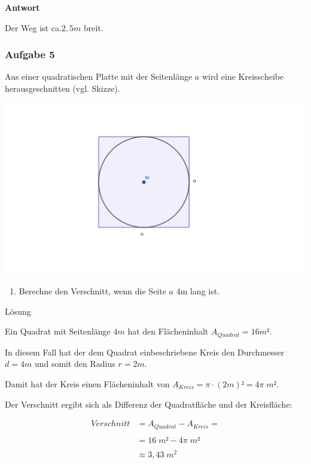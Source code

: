 \documentclass[
  ngerman,
]{book}
\providecommand{\tightlist}{%
  \setlength{\itemsep}{0pt}\setlength{\parskip}{0pt}}
\begin{document}
\textbf{Antwort}

Der Weg ist ca.\(2,5m\) breit.

\hypertarget{section-41}{%
\subsubsection*{}\label{section-41}}

\hypertarget{aufgabe-5-1}{%
\subsubsection*{Aufgabe 5}\label{aufgabe-5-1}}

Aus einer quadratischen Platte mit der Seitenlänge \(a\) wird eine Kreisscheibe herausgeschnitten (vgl. Skizze).

\includegraphics{./Bilder/KreisImQuadrat.png}

\begin{enumerate}
\def\labelenumi{\alph{enumi})}
\tightlist
\item
  Berechne den Verschnitt, wenn die Seite \(a\) 4m lang ist.
\end{enumerate}

Lösung

Ein Quadrat mit Seitenlänge \(4m\) hat den Flächeninhalt \(A_{Quadrat}=16m²\).

In diesem Fall hat der dem Quadrat einbeschriebene Kreis den Durchmesser \(d=4m\) und somit den Radius \(r=2m\).

Damit hat der Kreis einen Flächeninhalt von \(A_{Kreis}= \pi \cdot (2m)² = 4\pi\; m²\).

Der Verschnitt ergibt sich als Differenz der Quadratfläche und der Kreisfläche:

\[ \begin{align} Verschnitt &= A_{Quadrat} - A_{Kreis} =\\
{}\\
                            &= 16 \;m² - 4 \pi \;m² \\
                            {}\\
                            & \approx 3,43\; m^2\end{align}\]
\end{document}
